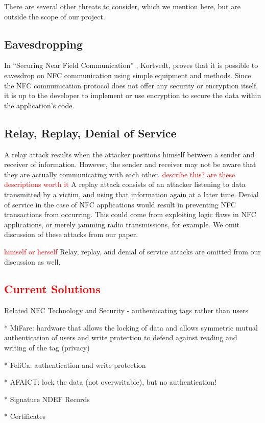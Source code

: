 \documentclass[12pt]{article}
\newcommand\TODO[1]{\textcolor{red}{#1}}
\newcommand\todo[1]{\textcolor{red}{#1}}
\begin{document}
There are several other threats to consider, which we mention here, but are outside the scope of our project.

\subsection{Eavesdropping}
In ``Securing Near Field Communication'' \cite{kortvedt2009}, Kortvedt, proves that it is possible to eavesdrop on NFC communication using simple equipment and methods.
Since the NFC communication protocol does not offer any security or encryption itself, it is up to the developer to implement or use encryption to secure the data within the application's code. 
\subsection{Relay, Replay, Denial of Service}
A relay attack results when the attacker positions himself between a sender and receiver of information.
However, the sender and receiver may not be aware that they are actually communicating with each other.
\TODO{describe this? are these descriptions worth it}
A replay attack consists of an attacker listening to data transmitted by a victim, and using that information again at a later time.
Denial of service in the case of NFC applications would result in preventing NFC transactions from occurring.
This could come from exploiting logic flaws in NFC applications, or merely jamming radio transmissions, for example.
We omit discussion of these attacks from our paper.

\todo{himself or herself}
Relay, replay, and denial of service attacks are omitted from our discussion as well.

\TODO{\subsection{Current Solutions}}
Related NFC Technology and Security - authenticating tags rather than users

* MiFare: hardware that allows the locking of data and allows symmetric mutual authentication of users and write protection to defend against reading and writing of the tag (privacy)

* FeliCa: authentication and write protection 

* AFAICT: lock the data (not overwritable), but no authentication!

* Signature NDEF Records

* Certificates 
\end{document}

